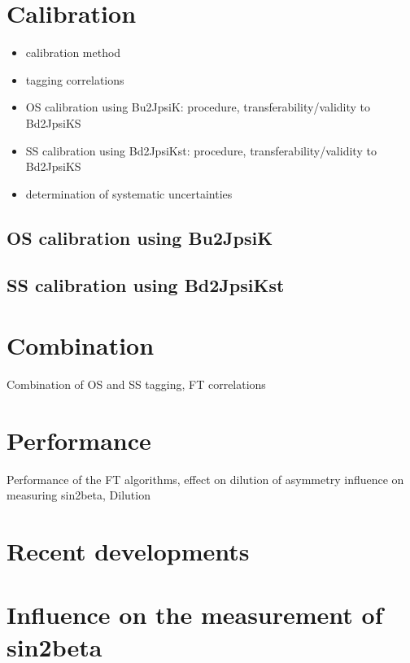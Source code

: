 \newpage

\section{Calibration}
\label{sec:flavour_tagging:calibration}
\begin{itemize}
  \item calibration method
  \item tagging correlations
  \item OS calibration using Bu2JpsiK: procedure, transferability/validity to Bd2JpsiKS
  \item SS calibration using Bd2JpsiKst: procedure, transferability/validity to Bd2JpsiKS
  \item determination of systematic uncertainties
\end{itemize}
\subsection{OS calibration using Bu2JpsiK}
\label{sec:flavour_tagging:calibration:os}
\subsection{SS calibration using Bd2JpsiKst}
\label{sec:flavour_tagging:calibration:ss}

\section{Combination}
\label{sec:flavour_tagging:combination}
Combination of OS and SS tagging, FT correlations

\section{Performance}
\label{sec:flavour_tagging:performance}
Performance of the FT algorithms, effect on dilution of asymmetry
influence on measuring sin2beta, Dilution

\section{Recent developments}
\label{sec:flavour_tagging:developments}

\section{Influence on the measurement of sin2beta}
\label{sec:flavour_tagging:sin2beta}
